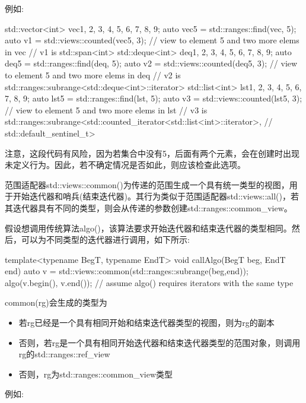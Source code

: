 例如:

\begin{cpp}
std::vector<int> vec{1, 2, 3, 4, 5, 6, 7, 8, 9};
auto vec5 = std::ranges::find(vec, 5);
auto v1 = std::views::counted(vec5, 3); // view to element 5 and two more elems in vec
	// v1 is std::span<int>
std::deque<int> deq{1, 2, 3, 4, 5, 6, 7, 8, 9};
auto deq5 = std::ranges::find(deq, 5);
auto v2 = std::views::counted(deq5, 3); // view to element 5 and two more elems in deq
	// v2 is std::ranges::subrange<std::deque<int>::iterator>
std::list<int> lst{1, 2, 3, 4, 5, 6, 7, 8, 9};
auto lst5 = std::ranges::find(lst, 5);
auto v3 = std::views::counted(lst5, 3); // view to element 5 and two more elems in lst
	// v3 is std::ranges::subrange<std::counted_iterator<std::list<int>::iterator>,
	// std::default_sentinel_t>
\end{cpp}

注意，这段代码有风险，因为若集合中没有5，后面有两个元素，会在创建时出现未定义行为。因此，若不确定情况是否如此，则应该检查此选项。


范围适配器std::views::common()为传递的范围生成一个具有统一类型的视图，用于开始迭代器和哨兵(结束迭代器)。其行为类似于范围适配器std::views::all()，若其迭代器具有不同的类型，则会从传递的参数创建std::ranges::common\_view。

假设想调用传统算法algo()，该算法要求开始迭代器和结束迭代器的类型相同。然后，可以为不同类型的迭代器进行调用，如下所示:

\begin{cpp}
template<typename BegT, typename EndT>
void callAlgo(BegT beg, EndT end)
{
	auto v = std::views::common(std::ranges::subrange(beg,end));
	algo(v.begin(), v.end()); // assume algo() requires iterators with the same type
}
\end{cpp}

common(rg)会生成的类型为

\begin{itemize}
\item
若rg已经是一个具有相同开始和结束迭代器类型的视图，则为rg的副本

\item
否则，若rg是一个具有相同开始迭代器和结束迭代器类型的范围对象，则调用rg的std::ranges::ref\_view

\item
否则，rg为std::ranges::common\_view类型
\end{itemize}

例如:

